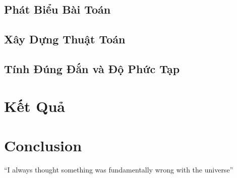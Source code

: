 \documentclass[15pt]{article}
\begin{document}
\subsection{Phát Biểu Bài Toán}
\subsection{Xây Dựng Thuật Toán}
\subsection{Tính Đúng Đắn và Độ Phức Tạp}
\section{Kết Quả}
\section{Conclusion}
``I always thought something was fundamentally wrong with the universe'' \citep{adams1995hitchhiker}



\end{document}
